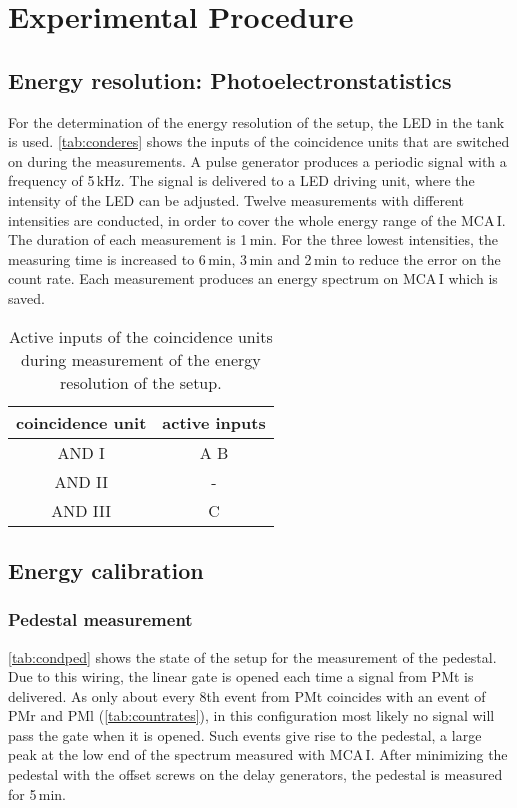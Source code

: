 \section{Experimental Procedure}


\subsection{Energy resolution: Photoelectronstatistics}
For the determination of the energy resolution of the setup, the LED in the tank is used.
\autoref{tab:conderes} shows the inputs of the coincidence units that are switched on during the measurements.
A pulse generator produces a periodic signal with a frequency of 5\,kHz.
The signal is delivered to a LED driving unit, where the intensity of the LED can be adjusted.
Twelve measurements with different intensities are conducted, in order to cover the whole energy range of the MCA\,I.
The duration of each measurement is 1\,min.
For the three lowest intensities, the measuring time is increased to 6\,min, 3\,min and 2\,min to reduce the error
on the count rate.
Each measurement produces an energy spectrum on MCA\,I which is saved.

\begin{table}[H]
\caption{Active inputs of the coincidence units during measurement of the energy resolution of the setup.}
\begin{center}
\begin{tabular}{|c|c|}
  \hline
  coincidence unit	& active inputs	\\ \hline\hline
  AND I				& A B			\\ \hline
  AND II			& -				\\ \hline
  AND III			& C				\\ \hline
 \end{tabular}
\end{center}
\label{tab:conderes}
\end{table}

\subsection{Energy calibration}

\subsubsection{Pedestal measurement}
\autoref{tab:condped} shows the state of the setup for the measurement of the pedestal.
Due to this wiring, the linear gate is opened each time a signal from PMt is delivered.
As only about every 8th event from PMt coincides with an event of PMr and PMl (\autoref{tab:countrates}),
in this configuration most likely no signal will pass the gate when it is opened.
Such events give rise to the pedestal, a large peak at the low end of the spectrum measured with MCA\,I.
After minimizing the pedestal with the offset screws on the delay generators, the pedestal is measured for
5\,min.

